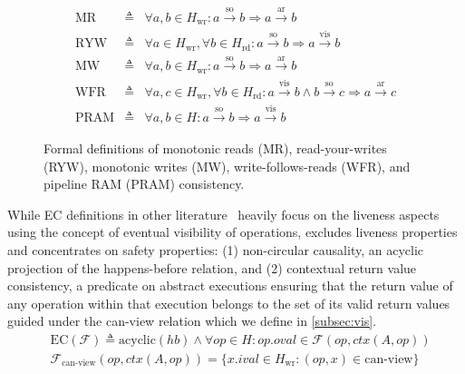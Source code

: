   \begin{figure}
    \begin{eqnarray*}
      \text{MR} & \triangleq & \forall a, b \in H_\text{wr}: a
      \xrightarrow{\text{so}} b \Rightarrow a \xrightarrow{\text{ar}} b
      \\
      \text{RYW} & \triangleq & \forall a \in H_\text{wr}, \forall b \in
      H_\text{rd}: a \xrightarrow{\text{so}} b \Rightarrow a
      \xrightarrow{\text{vis}} b
      \\
      \text{MW} & \triangleq & \forall a, b \in H_\text{wr}: a
      \xrightarrow{\text{so}} b \Rightarrow a \xrightarrow{\text{ar}} b
      \\
      \text{WFR} & \triangleq & \forall a, c \in H_\text{wr}, \forall b \in
      H_\text{rd}: a \xrightarrow{\text{vis}} b \land b
      \xrightarrow{\text{so}} c \Rightarrow a \xrightarrow{\text{ar}} c
      \\
      \text{PRAM} & \triangleq & \forall a, b \in H: a \xrightarrow{\text{so}}
      b \Rightarrow a \xrightarrow{\text{vis}} b
    \end{eqnarray*}
    \caption{Formal definitions of monotonic reads (MR), read-your-writes
      (RYW), monotonic writes (MW), write-follows-reads (WFR), and pipeline
    RAM (PRAM) consistency.}\label{fig:semdef}
  \end{figure}

  While EC definitions in other literature~\cite{terry1994session,
  eventual, viotti2016consistency}
  heavily focus on the liveness aspects using the concept of
  eventual visibility of operations,
  \sysname{} excludes liveness properties and concentrates on safety
  properties:
  (1) non-circular causality, an acyclic projection of the happens-before
  relation,
  and (2) contextual return value consistency, a predicate on abstract
  executions ensuring that the return value of any operation within
  that execution belongs to the set of its valid return values
  guided under the can-view relation which we define in \cref{subsec:vis}.
  \begin{align*}
    &\text{EC}(\mathcal{F}) \triangleq \text{acyclic}(hb) \land \forall
    op \in H: op.oval \in \mathcal{F}(op, ctx(A, op)) \\
    &\mathcal{F}_{\text{can-view}}(op, ctx(A, op)) = \{x.ival \in
    H_\text{wr} : (op, x) \in \text{can-view}\}
  \end{align*}

